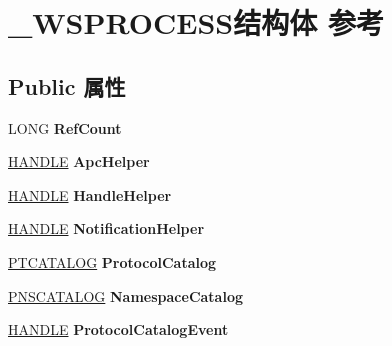 \hypertarget{struct___w_s_p_r_o_c_e_s_s}{}\section{\+\_\+\+W\+S\+P\+R\+O\+C\+E\+S\+S结构体 参考}
\label{struct___w_s_p_r_o_c_e_s_s}
\subsection*{Public 属性}
\begin{DoxyCompactItemize}
\item 
\mbox{\label{struct___w_s_p_r_o_c_e_s_s_ab2c507f0c3a51734c1ff5c6213010db3}} 
L\+O\+NG {\bfseries Ref\+Count}
\item 
\mbox{\label{struct___w_s_p_r_o_c_e_s_s_a7ce071da2c893d226516c4074b893b6a}} 
\hyperlink{interfacevoid}{H\+A\+N\+D\+LE} {\bfseries Apc\+Helper}
\item 
\mbox{\label{struct___w_s_p_r_o_c_e_s_s_aa2bc68bab74d8cb311751c237a4a4894}} 
\hyperlink{interfacevoid}{H\+A\+N\+D\+LE} {\bfseries Handle\+Helper}
\item 
\mbox{\label{struct___w_s_p_r_o_c_e_s_s_a09fc0f9ab2b77592289a11cf79efc427}} 
\hyperlink{interfacevoid}{H\+A\+N\+D\+LE} {\bfseries Notification\+Helper}
\item 
\mbox{\label{struct___w_s_p_r_o_c_e_s_s_a6cf1042ba2b5cdea36a78c3b55fbf130}} 
\hyperlink{struct___t_c_a_t_a_l_o_g}{P\+T\+C\+A\+T\+A\+L\+OG} {\bfseries Protocol\+Catalog}
\item 
\mbox{\label{struct___w_s_p_r_o_c_e_s_s_ad1b84a36d3b434c97dc478b0862ab071}} 
\hyperlink{struct___n_s_c_a_t_a_l_o_g}{P\+N\+S\+C\+A\+T\+A\+L\+OG} {\bfseries Namespace\+Catalog}
\item 
\mbox{\label{struct___w_s_p_r_o_c_e_s_s_a6b5bafd0c4dcf8264178923394b64c81}} 
\hyperlink{interfacevoid}{H\+A\+N\+D\+LE} {\bfseries Protocol\+Catalog\+Event}
\item 
\mbox{\label{struct___w_s_p_r_o_c_e_s_s_a05af0c23b279038dc09284746cc2f3ab}} 

\end{DoxyCompactItemize}
